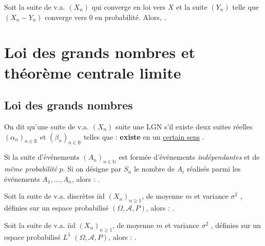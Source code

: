 \documentclass[10pt, french]{report}
\begin{document}
\begin{multicols*}{2}
\begin{definitionNOHFILLprop}[Théorème]
Soit la suite de v.a. $(X_{n})$ qui converge en loi vers $X$ et la suite $(Y_{n})$ telle que $(X_{n} - Y_{n})$ converge vers 0 en probabilité. Alors, .
\end{definitionNOHFILLprop}


\newpage
\chapter{Loi des grands nombres et théorème centrale limite}
\section{Loi des grands nombres}
\begin{definitionNOHFILL}
On dit qu'une suite de v.a. $(X_{n})$ suite une LGN s'il existe deux suites réelles $(\alpha_{n})_{n \in \mathbb{B}}$ et $(\beta_{n})_{n \in \mathbb{B}}$ telles que :  \textbf{existe} en un \og \underline{certain sens} \fg{}.
\end{definitionNOHFILL}

\begin{definitionNOHFILL}
Si la suite d'événements $(A_{n})_{n \in \mathbb{N}}$ est formée d'événements \textit{indépendantes} et de \textit{même probabilité} $p$. Si on désigne par $S_{n}$ le nombre de $A_{i}$ réalisés parmi les événements $A_{1}, \dots, A_{n}$, alors : .
\end{definitionNOHFILL}

\begin{definitionNOHFILL}[LFGN]
Soit la suite de v.a. discrètes iid $(X_{n})_{n \geq 1}$, de moyenne $m$ et variance $\sigma^{2}$ , définies sur un espace probabilisé $(\Omega, \mathcal{A}, P)$, alors : .
\end{definitionNOHFILL}

\begin{definitionNOHFILL}
Soit la suite de v.a. iid $(X_{n})_{n \geq 1}$, de moyenne $m$ et variance $\sigma^{2}$ , définies sur un espace probabilisé $L^{1}$ $(\Omega, \mathcal{A}, P)$, alors : .
\end{definitionNOHFILL}


\end{multicols*}
\end{document}
